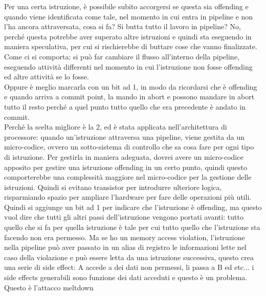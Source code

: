 \documentclass[14pt, oneside]{book}
\begin{document}
Per una certa istruzione, è possibile subito accorgersi se questa sia offending e quando viene identificata come tale, nel momento in cui entra in pipeline e non l'ha ancora attraversata, cosa si fa? Si butta tutto il lavoro in pipeline? No, perché questa potrebbe aver superato altre istruzioni e quindi sta eseguendo in maniera speculativa, per cui si rischierebbe di buttare cose che vanno finalizzate. Come ci si comporta: si può far cambiare il flusso all'interno della pipeline, eseguendo attività differenti nel momento in cui l'istruzione non fosse offending ed altre attività se lo fosse.\\ Oppure è meglio marcarla con un bit ad 1, in modo da ricordarsi che è offending e quando arriva a commit point, la mando in abort e possono mandare in abort tutto il resto perché a quel punto tutto quello che era precedente è andato in commit.\\ Perché la scelta migliore è la 2, ed è stata applicata nell'architettura di processore: quando un'istruzione attraversa una pipeline, viene gestita da un micro-codice, ovvero un sotto-sistema di controllo che sa cosa fare per ogni tipo di istruzione. Per gestirla in maniera adeguata, dovrei avere un micro-codice apposito per gestire una istruzione offending in un certo punto, quindi questo comporterebbe una complessità maggiore nel micro-codice per la gestione delle istruzioni. Quindi si evitano transistor per introdurre ulteriore logica, risparmiando spazio per ampliare l'hardware per fare delle operazioni più utili.\\ Quindi si aggiunge un bit ad 1 per indicare che l'istruzione è offending, ma questo vuol dire che tutti gli altri passi dell'istruzione vengono portati avanti: tutto quello che si fa per quella istruzione è tale per cui tutto quello che l'istruzione sta facendo non era permesso. Ma se ho un memory access violation, l'istruzione nella pipeline può aver passato in un alias di registro le informazioni lette nel caso della violazione e può essere letta da una istruzione successiva, questo crea una serie di side effect: A accede a dei dati non permessi, li passa a B ed etc... i side effects generabili sono funzione dei dati acceduti e questo è un problema.\\ Questo è l'attacco meltdown
\end{document}
